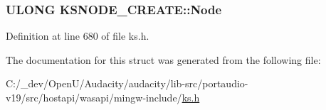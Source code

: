 \subsubsection[{\texorpdfstring{Node}{Node}}]{\setlength{\rightskip}{0pt plus 5cm}U\+L\+O\+NG K\+S\+N\+O\+D\+E\+\_\+\+C\+R\+E\+A\+T\+E\+::\+Node}\hypertarget{struct_k_s_n_o_d_e___c_r_e_a_t_e_a197de82f5566cd0d2d7d84e6fefaa1f4}{}\label{struct_k_s_n_o_d_e___c_r_e_a_t_e_a197de82f5566cd0d2d7d84e6fefaa1f4}


Definition at line 680 of file ks.\+h.



The documentation for this struct was generated from the following file\+:\begin{DoxyCompactItemize}
\item 
C\+:/\+\_\+dev/\+Open\+U/\+Audacity/audacity/lib-\/src/portaudio-\/v19/src/hostapi/wasapi/mingw-\/include/\hyperlink{ks_8h}{ks.\+h}\end{DoxyCompactItemize}
